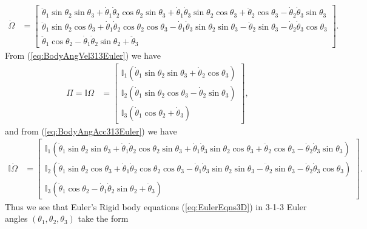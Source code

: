 \documentclass[graybox,envcountchap,sectrefs]{svmonoMuga}
\begin{document}
\begin{align}
\dot{\Omega}&= 
\begin{bmatrix}
\ddot{\theta}_1\sin{\theta_2}\sin{\theta_3}+\dot{\theta}_1\dot{\theta}_2\cos{\theta_2}\sin{\theta_3}+\dot{\theta}_1\dot{\theta}_3\sin{\theta_2}\cos{\theta_3}+\ddot{\theta}_2\cos{\theta_3}-\dot{\theta}_2\dot{\theta}_3\sin{\theta_3}\\
\ddot{\theta}_1\sin{\theta_2}\cos{\theta_3}+\dot{\theta}_1\dot{\theta}_2\cos{\theta_2}\cos{\theta_3}-\dot{\theta}_1\dot{\theta}_3\sin{\theta_2}\sin{\theta_3}-\ddot{\theta}_2\sin{\theta_3}-\dot{\theta}_2\dot{\theta}_3\cos{\theta_3}\\
\ddot{\theta}_1\cos{\theta_2}-\dot{\theta}_1\dot{\theta}_2\sin{\theta_2}+\ddot{\theta}_3
\end{bmatrix}.\label{eq:BodyAngAcc313Euler}
\end{align}
From (\ref{eq:BodyAngVel313Euler}) we have
\begin{align*}
\Pi=\mathbb{I}\Omega & = 
\begin{bmatrix}
\mathbb{I}_1\left(\dot{\theta}_1\sin{\theta_2}\sin{\theta_3}+\dot{\theta}_2\cos{\theta_3}\right)\\
\mathbb{I}_2\left(\dot{\theta}_1\sin{\theta_2}\cos{\theta_3}-\dot{\theta}_2\sin{\theta_3}\right)\\ 
\mathbb{I}_3\left(\dot{\theta}_1\cos{\theta_2}+\dot{\theta}_3\right)
\end{bmatrix},
\end{align*}
and from (\ref{eq:BodyAngAcc313Euler}) we have
\begin{align*}
\mathbb{I}\dot{\Omega}&= 
\begin{bmatrix}
\mathbb{I}_1\left(\ddot{\theta}_1\sin{\theta_2}\sin{\theta_3}+\dot{\theta}_1\dot{\theta}_2\cos{\theta_2}\sin{\theta_3}+\dot{\theta}_1\dot{\theta}_3\sin{\theta_2}\cos{\theta_3}+\ddot{\theta}_2\cos{\theta_3}-\dot{\theta}_2\dot{\theta}_3\sin{\theta_3}\right)\\
\mathbb{I}_2\left(\ddot{\theta}_1\sin{\theta_2}\cos{\theta_3}+\dot{\theta}_1\dot{\theta}_2\cos{\theta_2}\cos{\theta_3}-\dot{\theta}_1\dot{\theta}_3\sin{\theta_2}\sin{\theta_3}-\ddot{\theta}_2\sin{\theta_3}-\dot{\theta}_2\dot{\theta}_3\cos{\theta_3}\right)\\
\mathbb{I}_3\left(\ddot{\theta}_1\cos{\theta_2}-\dot{\theta}_1\dot{\theta}_2\sin{\theta_2}+\ddot{\theta}_3\right)
\end{bmatrix}.
\end{align*}
Thus we see that Euler's Rigid body equations (\ref{eq:EulerEqns3D}) in 3-1-3 Euler angles $(\theta_1,\theta_2,\theta_3)$ take the form
\end{document}
